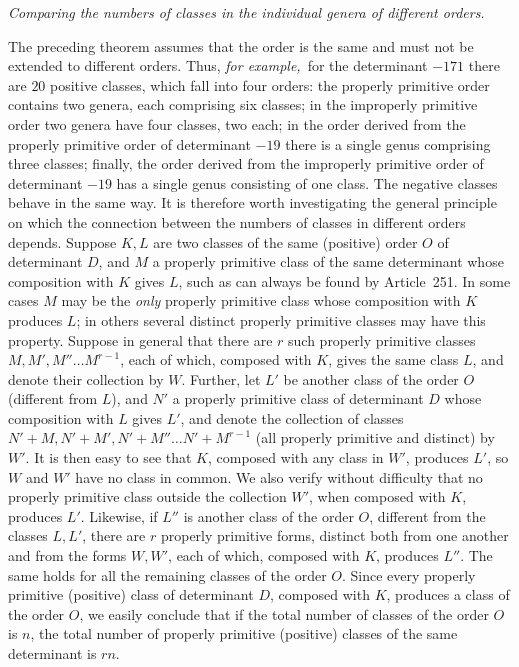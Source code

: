 \begin{center}
\textit{Comparing the numbers of classes in the individual genera of different orders.}
\end{center}

The preceding theorem assumes that the order is the same and must not be extended to different orders. Thus, \textit{for example,}\ for the determinant $-171$ there are $20$ positive classes, which fall into four orders: the properly primitive order contains two genera, each comprising six classes; in the improperly primitive order two genera have four classes, two each; in the order derived from the properly primitive order of determinant $-19$ there is a single genus comprising three classes; finally, the order derived from the improperly primitive order of determinant $-19$ has a single genus consisting of one class. The negative classes behave in the same way. It is therefore worth investigating the general principle on which the connection between the numbers of classes in different orders depends. Suppose $K,L$ are two classes of the same (positive) order $O$ of determinant $D$, and $M$ a properly primitive class of the same determinant whose composition with $K$ gives $L$, such as can always be found by Article~251. In some cases $M$ may be the \textit{only} properly primitive class whose composition with $K$ produces $L$; in others several distinct properly primitive classes may have this property. Suppose in general that there are $r$ such properly primitive classes $M,M',M''\ldots M^{r-1}$, each of which, composed with $K$, gives the same class $L$, and denote their collection by $W$. Further, let $L'$ be another class of the order $O$ (different from $L$), and $N'$ a properly primitive class of determinant $D$ whose composition with $L$ gives $L'$, and denote the collection of classes $N'+M,N'+M',N'+M''\ldots N'+M^{r-1}$ (all properly primitive and distinct) by $W'$. It is then easy to see that $K$, composed with any class in $W'$, produces $L'$, so $W$ and $W'$ have no class in common. We also verify without difficulty that no properly primitive class outside the collection $W'$, when composed with $K$, produces $L'$. Likewise, if $L''$ is another class of the order $O$, different from the classes $L,L'$, there are $r$ properly primitive forms, distinct both from one another and from the forms $W,W'$, each of which, composed with $K$, produces $L''$. The same holds for all the remaining classes of the order $O$. Since every properly primitive (positive) class of determinant $D$, composed with $K$, produces a class of the order $O$, we easily conclude that if the total number of classes of the order $O$ is $n$, the total number of properly primitive (positive) classes of the same determinant is $rn$.

